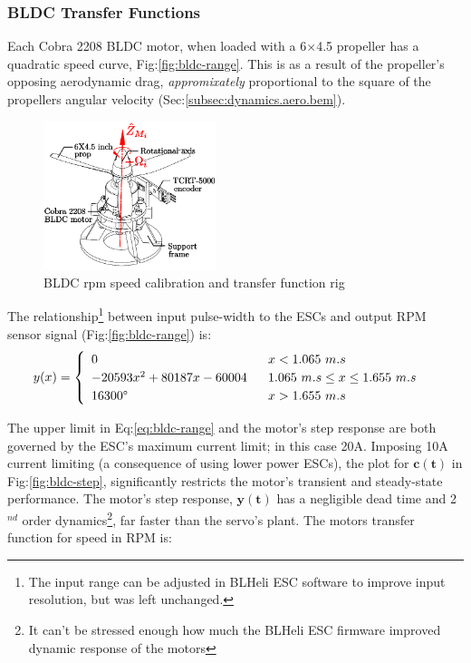 \subsubsection*{BLDC Transfer Functions}
Each Cobra 2208 BLDC motor, when loaded with a 6$\times$4.5 propeller has a quadratic speed curve, Fig:\ref{fig:bldc-range}. This is as a result of the propeller's opposing aerodynamic drag, \emph{appromixately} proportional to the square of the propellers angular velocity (Sec:\ref{subsec:dynamics.aero.bem}). 
\par
\begin{figure}[htb]
\vspace{-20pt}
\centering
\includegraphics[width=0.45\textwidth]{figs/bldc-rpm}
\caption{BLDC rpm speed calibration and transfer function rig}
\label{fig:bldc-rpm}
\vspace{-15pt}
\end{figure}
The relationship\footnote{The input range can be adjusted in BLHeli ESC software to improve input resolution, but was left unchanged.} between input pulse-width to the ESCs and output RPM sensor signal (Fig:\ref{fig:bldc-range}) is:
\begin{equation}
y(x)=
\begin{cases}\begin{array}{ll}
0 & ~~x<1.065~m.s\\
-20593x^2 + 80187x - 60004 & ~~1.065~m.s \leq x \leq 1.655~m.s\\
16300\text{\textdegree} & ~~x>1.655~m.s\\
\end{array}
\end{cases}
\label{eq:bldc-range}
\end{equation}
\par
The upper limit in Eq:\ref{eq:bldc-range} and the motor's step response are both governed by the ESC's maximum current limit; in this case 20A. Imposing 10A current limiting (a consequence of using lower power ESCs), the plot for {\color{YellowGreen}$\mathbf{c(t)}$} in Fig:\ref{fig:bldc-step}, significantly restricts the motor's transient and steady-state performance. The motor's step response, {\color{Purple}$\mathbf{y(t)}$} has a negligible dead time and 2$^{nd}$ order dynamics\footnote{It can't be stressed enough how much the BLHeli ESC firmware improved dynamic response of the motors}, far faster than the servo's plant. The motors transfer function for speed in RPM is:
